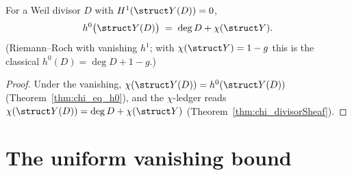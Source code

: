 \begin{theorem}
  \label{thm:h0_eq_deg_add_chi}
  \leanok
  For a Weil divisor \(D\) with \(H^1(\struct Y(D)) = 0\),
  \[
    h^0\bigl(\struct Y(D)\bigr) \;=\; \deg D + \chi(\struct Y) .
  \]
  (Riemann--Roch with vanishing \(h^1\); with \(\chi(\struct Y) = 1 - g\) this is the
  classical \(h^0(D) = \deg D + 1 - g\).)
\end{theorem}
\begin{proof}
  \leanok
  Under the vanishing, \(\chi(\struct Y(D)) = h^0(\struct Y(D))\)
  (Theorem~\ref{thm:chi_eq_h0}), and the \(\chi\)-ledger reads
  \(\chi(\struct Y(D)) = \deg D + \chi(\struct Y)\)
  (Theorem~\ref{thm:chi_divisorSheaf}).
\end{proof}

\section{The uniform vanishing bound}
\label{sec:uniformVanishing}

